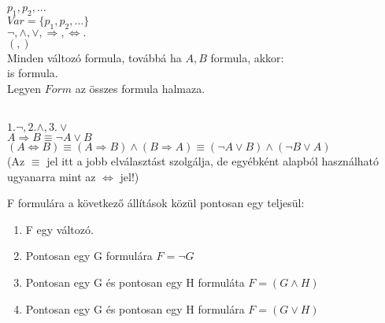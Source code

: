 \begin{frame}

\begin{tcolorbox}[squeezed title={(Ítélet) változók, Logikai szimbólumok, Elválasztó szimbólumok, Logikai formula}]
\mbigskip
{} $p_1, p_2, ...$\\
\hspace{1ex}  $Var = \{p_1, p_2, ...\}$\\
\mbigskip
{} ${\neg}, {\land}, {\lor}, {\Rightarrow}, {\iff}.$\\
\mbigskip
{} $(, )$\\
\mbigskip
{} Minden változó formula, továbbá ha $A, B$ formula, akkor:\\
 is formula.\\
\mbigskip
Legyen $Form$ az összes formula halmaza.
\end{tcolorbox}

\begin{tcolorbox}[title={Megj}]
\\ 
\mbigskip
$1. {\neg}, 2. {\land}, 3. {\lor}$\\
\mbigskip
$A \Rightarrow B \equiv {\neg}A \lor B$\\
$(A \iff B) \equiv (A \Rightarrow B) \land (B \Rightarrow A) \equiv ({\neg}A \lor B) \land ({\neg}B \lor A)$\\
\mbigskip
(Az $\equiv$ jel itt a jobb elválasztást szolgálja, de egyébként alapból használható ugyanarra mint az $\iff$ jel!)
\end{tcolorbox}
\end{frame}

\begin{frame}
\begin{tcolorbox}[title={Tétel: Minden formula egyértelműen olvasható}]
F formulára a következő állítások közül pontosan egy teljesül:
\begin{enumerate}
\item F egy változó.
\item Pontosan egy G formulára $F = \neg G$
\item Pontosan egy G és pontosan egy H formuláta $F = (G \land H)$
\item Pontosan egy G és pontosan egy H formulára $F = (G \lor H)$
\end{enumerate}
\end{tcolorbox}
\end{frame}


